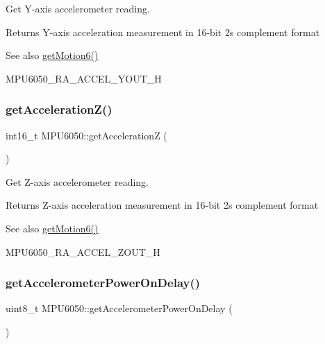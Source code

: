 Get Y-\/axis accelerometer reading. \begin{DoxyReturn}{Returns}
Y-\/axis acceleration measurement in 16-\/bit 2\textquotesingle{}s complement format 
\end{DoxyReturn}
\begin{DoxySeeAlso}{See also}
\mbox{\hyperlink{class_m_p_u6050_a574d3093dc131e4251a9b37adf208ca7}{get\+Motion6()}} 

M\+P\+U6050\+\_\+\+R\+A\+\_\+\+A\+C\+C\+E\+L\+\_\+\+Y\+O\+U\+T\+\_\+H 
\end{DoxySeeAlso}
\mbox{\label{class_m_p_u6050_acf5f5a20c10d99a1bdedf139f897bfdf}} 
\subsubsection{\texorpdfstring{getAccelerationZ()}{getAccelerationZ()}}
{\footnotesize\ttfamily int16\+\_\+t M\+P\+U6050\+::get\+AccelerationZ (\begin{DoxyParamCaption}{ }\end{DoxyParamCaption})}

Get Z-\/axis accelerometer reading. \begin{DoxyReturn}{Returns}
Z-\/axis acceleration measurement in 16-\/bit 2\textquotesingle{}s complement format 
\end{DoxyReturn}
\begin{DoxySeeAlso}{See also}
\mbox{\hyperlink{class_m_p_u6050_a574d3093dc131e4251a9b37adf208ca7}{get\+Motion6()}} 

M\+P\+U6050\+\_\+\+R\+A\+\_\+\+A\+C\+C\+E\+L\+\_\+\+Z\+O\+U\+T\+\_\+H 
\end{DoxySeeAlso}
\mbox{\label{class_m_p_u6050_aae903df2accc687423f9cd0a78f9cd32}} 
\subsubsection{\texorpdfstring{getAccelerometerPowerOnDelay()}{getAccelerometerPowerOnDelay()}}
{\footnotesize\ttfamily uint8\+\_\+t M\+P\+U6050\+::get\+Accelerometer\+Power\+On\+Delay (\begin{DoxyParamCaption}{ }\end{DoxyParamCaption})}

